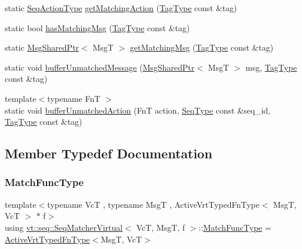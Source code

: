 \begin{DoxyCompactItemize}
\item 
static \hyperlink{structvt_1_1seq_1_1_seq_matcher_virtual_aa53d05ef480fb78161b56db33018b3b0}{Seq\+Action\+Type} \hyperlink{structvt_1_1seq_1_1_seq_matcher_virtual_a1ddc4f02c3182900d9212cd765c7af87}{get\+Matching\+Action} (\hyperlink{namespacevt_a84ab281dae04a52a4b243d6bf62d0e52}{Tag\+Type} const \&tag)
\item 
static bool \hyperlink{structvt_1_1seq_1_1_seq_matcher_virtual_ae96fef9bd738d6f93b9b89163efd1770}{has\+Matching\+Msg} (\hyperlink{namespacevt_a84ab281dae04a52a4b243d6bf62d0e52}{Tag\+Type} const \&tag)
\item 
static \hyperlink{namespacevt_ab2b3d506ec8e8d1540aede826d84a239}{Msg\+Shared\+Ptr}$<$ MsgT $>$ \hyperlink{structvt_1_1seq_1_1_seq_matcher_virtual_a96c97161692124a9c0ad629d4e1d9639}{get\+Matching\+Msg} (\hyperlink{namespacevt_a84ab281dae04a52a4b243d6bf62d0e52}{Tag\+Type} const \&tag)
\item 
static void \hyperlink{structvt_1_1seq_1_1_seq_matcher_virtual_a60dd673159850b4dea0b0d5e69f2ddef}{buffer\+Unmatched\+Message} (\hyperlink{namespacevt_ab2b3d506ec8e8d1540aede826d84a239}{Msg\+Shared\+Ptr}$<$ MsgT $>$ msg, \hyperlink{namespacevt_a84ab281dae04a52a4b243d6bf62d0e52}{Tag\+Type} const \&tag)
\item 
{\footnotesize template$<$typename FnT $>$ }\\static void \hyperlink{structvt_1_1seq_1_1_seq_matcher_virtual_a1679c1eba073362e70808fb89a174c6c}{buffer\+Unmatched\+Action} (FnT action, \hyperlink{namespacevt_1_1seq_a3b612da217ac669d39c159f134ab8434}{Seq\+Type} const \&seq\+\_\+id, \hyperlink{namespacevt_a84ab281dae04a52a4b243d6bf62d0e52}{Tag\+Type} const \&tag)
\end{DoxyCompactItemize}


\subsection{Member Typedef Documentation}
\mbox{\label{structvt_1_1seq_1_1_seq_matcher_virtual_a0aa078b1c0bd92a24d66073670b13b42}} 
\subsubsection{\texorpdfstring{Match\+Func\+Type}{MatchFuncType}}
{\footnotesize\ttfamily template$<$typename VcT , typename MsgT , Active\+Vrt\+Typed\+Fn\+Type$<$ Msg\+T, Vc\+T $>$ $\ast$ f$>$ \\
using \hyperlink{structvt_1_1seq_1_1_seq_matcher_virtual}{vt\+::seq\+::\+Seq\+Matcher\+Virtual}$<$ VcT, MsgT, f $>$\+::\hyperlink{structvt_1_1seq_1_1_seq_matcher_virtual_a0aa078b1c0bd92a24d66073670b13b42}{Match\+Func\+Type} =  \hyperlink{namespacevt_1_1vrt_a14077459ea3367e5834151d314ff4bc8}{Active\+Vrt\+Typed\+Fn\+Type}$<$MsgT, VcT$>$}


